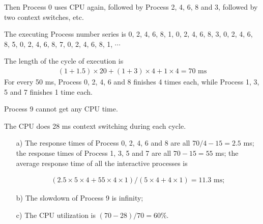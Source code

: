 \documentclass[12pt,letterpaper]{article}
\begin{document}
Then Process 0 uses CPU again, followed by Process 2, 4, 6, 8 and 3, followed by two context switches, etc.


The executing Process number series is 0, 2, 4, 6, 8, 1, 0, 2, 4, 6, 8, 3, 0, 2, 4, 6, 8, 5, 0, 2, 4, 6, 8, 7, 0, 2, 4, 6, 8, 1, $\cdots$

The length of the cycle of execution is 
\begin{eqnarray}
(1+1.5)\times20+(1+3)\times4+1\times4=70\textrm{ ms}
\end{eqnarray}
For every 50 ms, Process 0, 2, 4, 6 and 8 finishes 4 times each, while Process 1, 3, 5 and 7 finishes 1 time each.

Process 9 cannot get any CPU time.

The CPU does 28 ms context switching during each cycle.

\begin{enumerate}
\item[a)] The response times of Process 0, 2, 4, 6 and 8 are all $70/4-15=2.5$ ms; the response times of Process 1, 3, 5 and 7 are all $70-15=55$ ms; the average response time of all the interactive processes is 

\begin{eqnarray}
(2.5\times5\times4+55\times4\times1)/(5\times4+4\times1)=11.3\textrm{ ms};
\end{eqnarray}

\item[b)] The slowdown of Process 9 is infinity;
\item[c)] The CPU utilization is $(70-28)/70=60\%$.
\end{enumerate}
\end{document}
